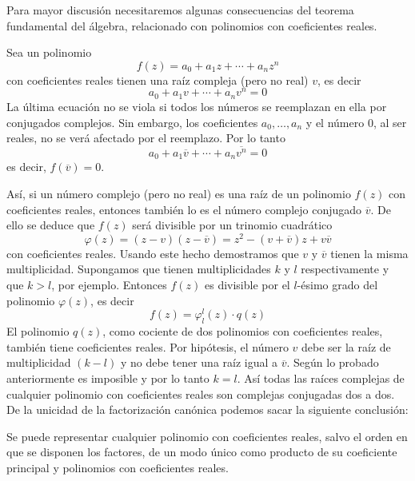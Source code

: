 Para mayor discusión necesitaremos algunas consecuencias del teorema fundamental del álgebra, relacionado con polinomios con coeficientes reales.

Sea un polinomio
$$f(z)=a_0+a_1z+ \cdots + a_nz^n$$
con coeficientes reales tienen una raíz compleja (pero no real) $v$, es decir
$$a_0+a_1v+ \cdots + a_nv^n=0$$
La última ecuación no se viola si todos los números se reemplazan en ella por conjugados complejos. Sin embargo, los coeficientes $a_0,  \dots,  a_n$ y el número $0$, al ser reales, no se verá afectado por el reemplazo. Por lo tanto
$$a_0+a_1\overline{v}+ \cdots + a_n\overline{v^n}=0$$
es decir, $f(\overline{v})=0$.

Así, si un número complejo (pero no real) es una raíz de un polinomio $f(z)$ con coeficientes reales, entonces también lo es el número complejo conjugado $\overline{v}$. De ello se deduce que $f(z)$ será divisible por un trinomio cuadrático
$$\varphi (z)=(z-v)(z-\overline{v}) = z^2 - (v+\overline{v})z+v \overline{v}$$
con coeficientes reales. Usando este hecho demostramos que $v$ y $\overline{v}$ tienen la misma multiplicidad. Supongamos que tienen multiplicidades $k$ y $l$ respectivamente y que $k > l$, por ejemplo. Entonces $f(z)$ es divisible por el $l$-ésimo grado del polinomio $\varphi (z)$, es decir
$$f(z)=\varphi _l^l (z) \cdot q(z)$$
El polinomio $q(z)$, como cociente de dos polinomios con coeficientes reales, también tiene coeficientes reales. Por hipótesis, el número $v$ debe ser la raíz de multiplicidad $(k - l)$ y no debe tener una raíz igual a $\overline{v}$. Según lo probado anteriormente es imposible y por lo tanto $k = l$. Así todas las raíces complejas de cualquier polinomio con coeficientes reales son complejas conjugadas dos a dos. De la unicidad de la factorización canónica podemos sacar la siguiente conclusión:

\begin{tcolorbox}[
        theorem style=change break,
        enhanced,
        breakable,
        boxrule=0pt,
        frame hidden,
        borderline west={3pt}{0pt}{black},
        colback=gray!20,
        coltitle=gray!90,
        attach title to upper={\ },
        sharp corners,
        fonttitle=\bfseries,
        fontupper=\normalsize
    ]
    Se puede representar cualquier polinomio con coeficientes reales, salvo el orden en que se disponen los factores, de un modo único como producto de su coeficiente principal y polinomios con coeficientes reales.
\end{tcolorbox}

